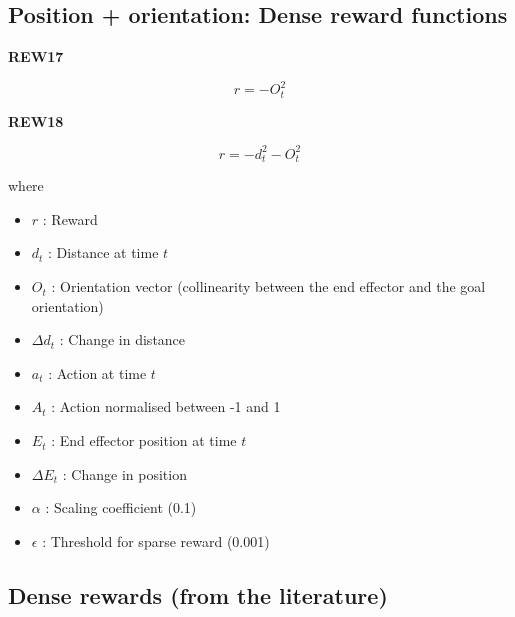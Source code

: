 \documentclass{article}
\newcommand{\norm}[1]{\left\lVert#1\right\rVert}
\begin{document}
\subsection{Position + orientation: Dense reward functions}

\textbf{REW17}

\begin{equation}
r = - O_t^2
\end{equation}

\textbf{REW18}

\begin{equation}
r = - d_t^2 - O_t^2
\end{equation}



%
%
%


%



where
\begin{itemize}  
\item $r$ : Reward
\item $d_t$ : Distance at time $t$ 
\item $O_t$ : Orientation vector (collinearity between the end effector and the goal orientation)
\item $\Delta d_t$ : Change in distance
\item $a_t$ : Action at time $t$ 
\item $A_t$ : Action normalised between -1 and 1 
\item $E_t$ : End effector position at time $t$
\item $\Delta E_t$ : Change in position
\item $\alpha$ : Scaling coefficient (0.1)
\item $\epsilon$ : Threshold for sparse reward (0.001)
\end{itemize}


\subsection{Dense rewards (from the literature)}
\end{document}
